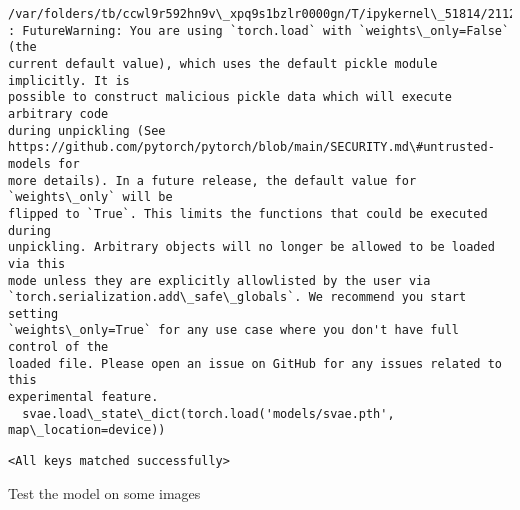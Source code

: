 \documentclass[11pt]{article}
\makeatletter
\newcommand{\boxspacing}{\kern\kvtcb@left@rule\kern\kvtcb@boxsep}
\newcommand{\prompt}[4]{
        {\ttfamily\llap{{\color{#2}[#3]:\hspace{3pt}#4}}\vspace{-\baselineskip}}
    }
\makeatother
\begin{document}
    \begin{Verbatim}[commandchars=\\\{\}]
/var/folders/tb/ccwl9r592hn9v\_xpq9s1bzlr0000gn/T/ipykernel\_51814/2112457366.py:7
: FutureWarning: You are using `torch.load` with `weights\_only=False` (the
current default value), which uses the default pickle module implicitly. It is
possible to construct malicious pickle data which will execute arbitrary code
during unpickling (See
https://github.com/pytorch/pytorch/blob/main/SECURITY.md\#untrusted-models for
more details). In a future release, the default value for `weights\_only` will be
flipped to `True`. This limits the functions that could be executed during
unpickling. Arbitrary objects will no longer be allowed to be loaded via this
mode unless they are explicitly allowlisted by the user via
`torch.serialization.add\_safe\_globals`. We recommend you start setting
`weights\_only=True` for any use case where you don't have full control of the
loaded file. Please open an issue on GitHub for any issues related to this
experimental feature.
  svae.load\_state\_dict(torch.load('models/svae.pth', map\_location=device))
    \end{Verbatim}

            \begin{tcolorbox}[breakable, size=fbox, boxrule=.5pt, pad at break*=1mm, opacityfill=0]
\prompt{Out}{outcolor}{7}{\boxspacing}
\begin{Verbatim}[commandchars=\\\{\}]
<All keys matched successfully>
\end{Verbatim}
\end{tcolorbox}
        
    Test the model on some images
\end{document}
